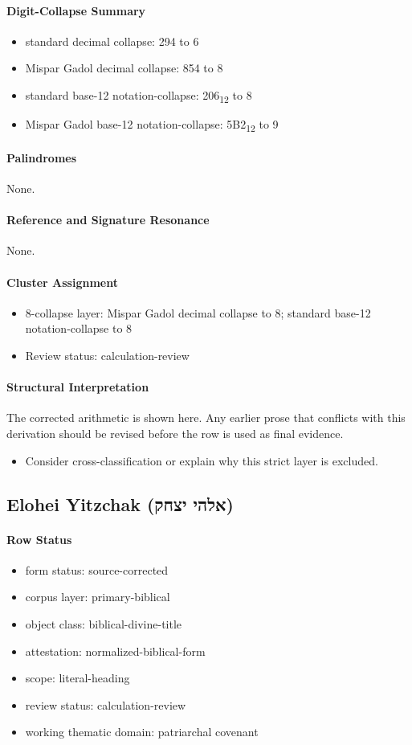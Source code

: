 \paragraph{Digit-Collapse Summary}
\begin{itemize}
\item standard decimal collapse: 294 to 6
\item Mispar Gadol decimal collapse: 854 to 8
\item standard base-12 notation-collapse: 206\textsubscript{12} to 8
\item Mispar Gadol base-12 notation-collapse: 5B2\textsubscript{12} to 9
\end{itemize}
\paragraph{Palindromes}
None.
\paragraph{Reference and Signature Resonance}
None.
\paragraph{Cluster Assignment}
\begin{itemize}
\item 8-collapse layer: Mispar Gadol decimal collapse to 8; standard base-12 notation-collapse to 8
\item Review status: calculation-review
\end{itemize}
\paragraph{Structural Interpretation}
The corrected arithmetic is shown here. Any earlier prose that conflicts with this derivation should be revised before the row is used as final evidence.

\begin{itemize}
\item Consider cross-classification or explain why this strict layer is excluded.
\end{itemize}

\subsection{Elohei Yitzchak (אלהי יצחק)}
\paragraph{Row Status}
\begin{itemize}
\item form status: source-corrected
\item corpus layer: primary-biblical
\item object class: biblical-divine-title
\item attestation: normalized-biblical-form
\item scope: literal-heading
\item review status: calculation-review
\item working thematic domain: patriarchal covenant
\end{itemize}
